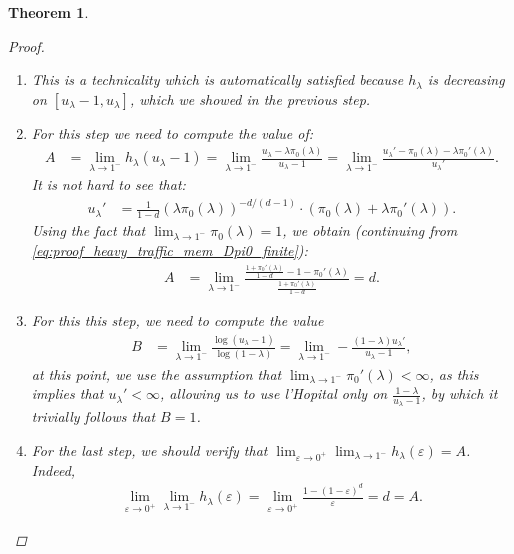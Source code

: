 \documentclass[12pt]{report}
\newtheorem{theorem}{Theorem}
\begin{document}
\begin{theorem}
\begin{proof}
\begin{enumerate}[label=(\alph*), leftmargin=*]
\item This is a technicality which is automatically satisfied because $h_\lambda$ is decreasing on $[u_\lambda-1, u_\lambda]$, which we showed in the previous step.
\item For this step we need to compute the value of:
\begin{align}
A
&=\lim_{\lambda \rightarrow 1^-} h_\lambda(u_\lambda - 1)=\lim_{\lambda \rightarrow 1^-} \frac{u_\lambda - \lambda \pi_0(\lambda)}{u_\lambda - 1}=\lim_{\lambda \rightarrow 1^-} \frac{u_\lambda' - \pi_0(\lambda) - \lambda \pi_0'(\lambda)}{u_\lambda'}.\label{eq:proof_heavy_traffic_mem_Dpi0_finite}
\end{align}
It is not hard to see that:
\begin{align*}
u_\lambda'
&= \frac{1}{1-d} (\lambda \pi_0(\lambda))^{-d/(d-1)} \cdot \left(\pi_0(\lambda) + \lambda \pi_0'(\lambda) \right).
\end{align*}
Using the fact that $\lim_{\lambda \rightarrow 1^-} \pi_0(\lambda) = 1$, we obtain (continuing from \eqref{eq:proof_heavy_traffic_mem_Dpi0_finite}):
\begin{align*}
A
&= \lim_{\lambda\rightarrow 1^-} \frac{\frac{1+ \pi_0'(\lambda)}{1-d} - 1 - \pi_0'(\lambda)}{\frac{1+ \pi_0'(\lambda)}{1-d}} = d.
\end{align*}
\item For this this step, we need to compute the value \label{item:probleempunt_heavy_mem}
\begin{align*}
B&=\lim_{\lambda \rightarrow 1^-} \frac{\log(u_\lambda - 1)}{\log(1-\lambda)}= \lim_{\lambda \rightarrow 1^-} - \frac{(1-\lambda) u_\lambda'}{u_\lambda-1},
\end{align*}
at this point, we use the assumption that $\lim_{\lambda\rightarrow 1^-} \pi_0'(\lambda) < \infty$, as this implies that $u_\lambda' < \infty$, allowing us to use l'Hopital only on $\frac{1-\lambda}{u_\lambda-1}$, by which it trivially follows that $B=1$.
\item For the last step, we should verify that $\lim_{\varepsilon \rightarrow 0^+} \lim_{\lambda \rightarrow 1^-} h_\lambda(\varepsilon)=A$. Indeed,
\begin{align*}
\lim_{\varepsilon \rightarrow 0^+} \lim_{\lambda \rightarrow 1^-} h_\lambda (\varepsilon)
= \lim_{\varepsilon\rightarrow 0^+} \frac{1-(1-\varepsilon)^d}{\varepsilon} = d = A.
\end{align*}
\end{enumerate}
\end{proof}
\end{theorem}
\end{document}
